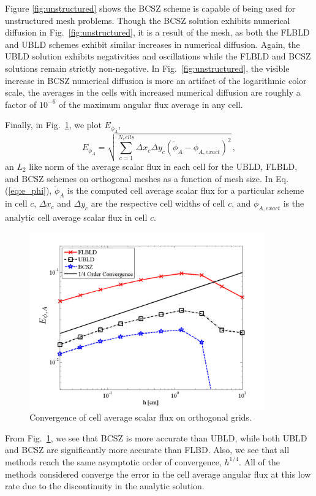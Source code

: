 \documentclass{mc2015}
\newcommand{\fig}[1]{Fig.~\ref{#1}}                      %
\newcommand{\benum}{\begin{equation}} 			%
\newcommand{\eenum}{\end{equation}}
\newcommand{\eqt}[1]{Eq. (\ref{#1})}  %
\newcommand{\pec}{\, ,}
\begin{document}
Figure \ref{fig:unstructured} shows the BCSZ scheme is capable of being used for unstructured mesh problems.
Though the BCSZ solution exhibits numerical diffusion in \fig{fig:unstructured}, it is a result of the mesh, as both the FLBLD and UBLD schemes exhibit similar increases in numerical diffusion.  Again, the UBLD solution exhibits negativities and oscillations while the FLBLD and BCSZ solutions remain strictly non-negative.  In \fig{fig:unstructured}, the visible increase in BCSZ numerical diffusion is more an artifact of the logarithmic color scale, the averages in the cells with increased numerical diffusion are roughly a factor of $10^{-6}$ of the maximum angular flux average in any cell. 

Finally, in \fig{fig:convergence}, we plot $E_{\phi_A}$,
\benum
\label{eq:e_phi}
E_{\phi_A} = \sqrt{ \sum_{c=1}^{N_cells}{ \Delta x_c \Delta y_c (\widetilde{\phi}_A - \phi_{A,exact} )^2} } \pec
\eenum
an $L_2$ like norm of the average scalar flux in each cell for the UBLD, FLBLD, and BCSZ schemes on orthogonal meshes as a function of mesh size.  
In \eqt{eq:e_phi}, $\widetilde{\phi}_A$ is the computed cell average scalar flux for a particular scheme in cell $c$, $\Delta x_c$ and $\Delta y_c$ are the respective cell widths of cell $c$, and $\phi_{A,exact}$ is the analytic cell average scalar flux in cell $c$.
\begin{figure}[h]
\centering
\includegraphics[width=4in]{glance_convergence}
\caption{Convergence of cell average scalar flux on orthogonal grids.}
\label{fig:convergence}
\end{figure}
From \fig{fig:convergence}, we see that BCSZ is more accurate than UBLD, while both UBLD and BCSZ are significantly more accurate than FLBD.
Also, we see that all methods reach the same asymptotic order of convergence, $h^{1/4}$.
All of the methods considered converge the error in the cell average angular flux at this low rate due to the discontinuity in the analytic solution.
\end{document}
